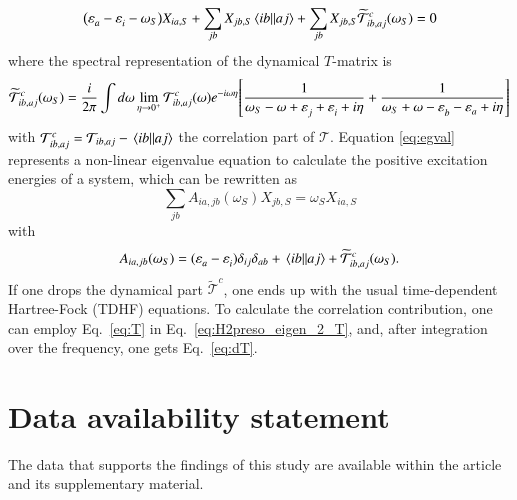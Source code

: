 \documentclass[aip,jcp,reprint,noshowkeys,superscriptaddress]{revtex4-1}
\newcommand{\e}[2]{\eps_{#1}^{#2}}
\newcommand{\eps}{\varepsilon}
\newcommand{\cT}{\mathcal{T}}
\begin{document}
\begin{equation}
	\label{eq:egval}
	\qty(\e{a}{}-\e{i}{}-\omega_S) X_{ia,S}+\sum_{jb}X_{jb,S}\mel{ib}{}{aj} + \sum_{jb}X_{jb,S}\widetilde{\cT}^c_{ib,aj}(\omega_S)=0
\end{equation}
where the spectral representation of the dynamical $T$-matrix is
\begin{equation}
	\widetilde{\cT}^c_{ib,aj}(\omega_S)
	= \frac{i}{2\pi}\int d\omega \lim_{\eta \to 0^+}\cT^c_{ib,aj}(\omega)e^{-i\omega\eta} \qty[\frac{1}{\omega_S-\omega+\e{j}{}+\e{i}{}+i\eta}+\frac{1}{\omega_S+\omega-\e{b}{}-\e{a}{}+i\eta}] 
 \label{eq:H2preso_eigen_2_T}
\end{equation}
with $\cT^c_{ib,aj}=\cT_{ib,aj}-\mel{ib}{}{aj}$ the correlation part of $\cT$. 
Equation \eqref{eq:egval} represents a non-linear eigenvalue equation to calculate the positive excitation energies of a system, which can be rewritten as
\begin{equation}
\label{eq:H2preso_eigen}
	\sum_{jb} A_{ia,jb}(\omega_S) X_{jb,S}=\omega_S X_{ia,S}
\end{equation}
with
\begin{equation}
	A_{ia,jb}(\omega_S)=(\e{a}{}-\e{i}{})\delta_{ij}\delta_{ab} + \mel{ib}{}{aj} + \widetilde{\cT}^c_{ib,aj}(\omega_S).
\end{equation}
If one drops the dynamical part $\widetilde{\cT}^c$, one ends up with the usual time-dependent Hartree-Fock (TDHF) equations. \cite{Dreuw_2005} To calculate the correlation contribution, one can employ Eq.~\eqref{eq:T} in Eq.~\eqref{eq:H2preso_eigen_2_T}, and, after integration over the frequency, one gets Eq.~\eqref{eq:dT}.

\twocolumngrid
\section*{Data availability statement}
The data that supports the findings of this study are available within the article and its supplementary material.


\end{document}
